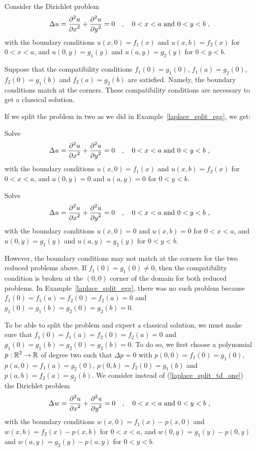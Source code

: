 \begin{rmk}
Consider the Dirichlet problem
\begin{equation} \label{laplace_split_td_one}
\Delta u = \pdydxn{u}{x}{2} + \pdydxn{u}{y}{2} = 0
\quad , \quad 0 < x < a \ \text{and} \ 0 < y < b \ ,
\end{equation}
with the boundary conditions $u(x,0) = f_1(x)$ and $u(x,b) = f_2(x)$
for $0<x<a$, and $u(0,y) = g_1(y)$ and $u(a,y) = g_2(y)$ for $0<y<b$.

Suppose that the compatibility conditions $f_1(0) = g_1(0)$, $f_1(a) =
g_2(0)$, $f_2(0) = g_1(b)$ and $f_2(a) = g_2(b)$ are satisfied.
Namely, the boundary conditions match at the corners.  These
compatibility conditions are necessary to get a classical solution.

If we split the problem in two as we did in
Example~\ref{laplace_split_egg}, we get:

Solve
\[
\Delta u = \pdydxn{u}{x}{2} + \pdydxn{u}{y}{2} = 0
\quad , \quad 0 < x < a \ \text{and} \ 0 < y < b \ ,
\]
with the boundary conditions $u(x,0) = f_1(x)$ and
$u(x,b) = f_2(x)$ for $0<x<a$, and 
$u(0,y) = 0$ and $u(a,y) = 0$ for $0<y<b$.

Solve
\[
\Delta u = \pdydxn{u}{x}{2} + \pdydxn{u}{y}{2} = 0
\quad , \quad 0 < x < a \ \text{and} \ 0 < y < b \ ,
\]
with the boundary conditions
$u(x,0) = 0$ and $u(x,b) = 0$ for $0<x<a$, and
$u(0,y) = g_1(y)$ and $u(a,y) = g_2(y)$ for $0<y<b$.

However, the boundary conditions may not match at the corners for the
two reduced problems above.  If $f_1(0) = g_1(0) \neq 0$, then the
compatibility condition is broken at the $(0,0)$ corner of the domain
for both reduced problems.  In Example~\ref{laplace_split_egg},
there was no such problem because $f_1(0) = f_1(a) = f_2(0) = f_2(a) = 0$
and $g_1(0) = g_1(b) = g_2(0) = g_2(b) = 0$.

To be able to split the problem and expect a classical solution, we
must make sure that $f_1(0) = f_1(a) = f_2(0) = f_2(a) = 0$ and
$g_1(0) = g_1(b) = g_2(0) = g_2(b) = 0$.  To do so, we first choose a
polynomial $\displaystyle p:\mathbb{R}^2\to \mathbb{R}$ of degree two such that
$\Delta p = 0$ with
$p(0,0) = f_1(0) = g_1(0)$, $p(a,0) = f_1(a) = g_2(0)$,
$p(0,b) = f_2(0) = g_1(b)$ and $p(a,b) = f_2(a) = g_2(b)$.
We consider instead of (\ref{laplace_split_td_one}) the Dirichlet
problem
\[
\Delta w = \frac{\displaystyle \partial^{2}{u}} {\displaystyle \partial x^{2}} + \frac{\displaystyle \partial^{2}{u}} {\displaystyle \partial y^{2}} = 0 \quad ,
\quad 0 < x < a \ \text{and} \ 0 < y < b \ ,
\]
with the boundary conditions
$w(x,0) = f_1(x) - p(x,0)$ and $w(x,b) = f_2(x) - p(x,b)$
for $0<x<a$, and $w(0,y) = g_1(y) - p(0,y)$ and
$w(a,y) = g_2(y) - p(a,y)$ for $0<y<b$.


\end{rmk}
